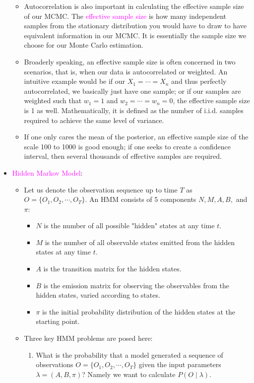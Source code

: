 \documentclass[UTF8]{book}
\newcommand{\concept}[1]{\textcolor{magenta}{#1}}
\begin{document}
\begin{itemize}
\begin{itemize}
	\item Autocorrelation is also important in calculating the effective sample size of our MCMC. The \concept{effective sample size} is how many independent samples from the stationary distribution you would have to draw to have equivalent information in our MCMC. It is essentially the sample size we choose for our Monte Carlo estimation.
	\item Broaderly speaking, an effective sample size is often concerned in two scenarios, that is, when our data is autocorrelated or weighted. An intuitive example would be if our $X_1=\cdots=X_n$ and thus perfectly autocorrelated, we basically just have one sample; or if our samples are weighted such that $w_1=1$ and $w_2=\cdots=w_n=0$, the effective sample size is 1 as well. Mathematically, it is defined as the number of i.i.d. samples required to achieve the same level of variance.
	\item If one only cares the mean of the posterior, an effective sample size of the scale 100 to 1000 is good enough; if one seeks to create a confidence interval, then several thousands of effective samples are required.
\end{itemize}
\item \concept{Hidden Markov Model}:
\begin{itemize}
	\item Let us denote the observation sequence up to time $T$ as $O=\{O_1,O_2,\cdots,O_T\}$. An HMM consists of 5 components $N,M,A,B,$ and $\pi$:
	\begin{itemize}
		\item $N$ is the number of all possible "hidden" states at any time $t$.
		\item $M$ is the number of all observable states emitted from the hidden states at any time $t$.
		\item $A$ is the transition matrix for the hidden states.
		\item $B$ is the emission matrix for observing the observables from the hidden states, varied according to states.
		\item $\pi$ is the initial probability distribution of the hidden states at the starting point.
	\end{itemize}
	\item Three key HMM problems are posed here:
	\begin{enumerate}
		\item What is the probability that a model generated a sequence of observations $O = \{O_1,O_2,\cdots,O_T\}$ given the input parameters $\lambda = (A,B,\pi)$? Namely we want to calculate $P(O\mid\lambda)$.

\end{enumerate}
\end{itemize}
\end{itemize}
\end{document}
